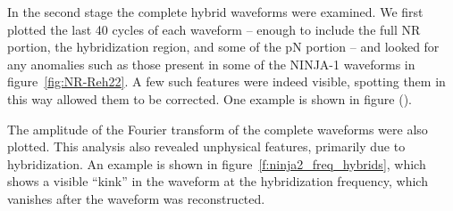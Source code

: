 In the second stage the complete hybrid waveforms were examined.
We first plotted the last 40 cycles of each waveform -- enough to
include the full NR portion, the hybridization region, and some of the
pN portion -- and looked for any anomalies such as those present in
some of the NINJA-1 waveforms in figure~\ref{fig:NR-Reh22}.  A few such
features were indeed visible, spotting them in this way allowed them
to be corrected.  One example is shown in figure ().

The amplitude of the Fourier transform of the complete waveforms were
also plotted.  This analysis also revealed unphysical features, 
primarily due to hybridization.  An example is shown in
figure~\ref{f:ninja2_freq_hybrids}, which shows a visible ``kink'' in
the waveform at the hybridization frequency, which vanishes after the
waveform was reconstructed.

